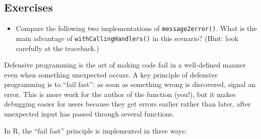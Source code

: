 \subsection{Exercises}

\begin{itemize}
\item
  Compare the following two implementations of \texttt{message2error()}.
  What is the main advantage of \texttt{withCallingHandlers()} in this
  scenario? (Hint: look carefully at the traceback.)

\begin{Shaded}
\begin{Highlighting}[]
\StringTok{ }
   
\NormalTok{\}}
\StringTok{ }
   
\NormalTok{\}}
\end{Highlighting}
\end{Shaded}
\end{itemize}


Defensive programming is the art of making code fail in a well-defined
manner even when something unexpected occurs. A key principle of
defensive programming is to ``fail fast'': as soon as something wrong is
discovered, signal an error. This is more work for the author of the
function (you!), but it makes debugging easier for users because they
get errors earlier rather than later, after unexpected input has passed
through several functions. 

In R, the ``fail fast'' principle is implemented in three ways:

